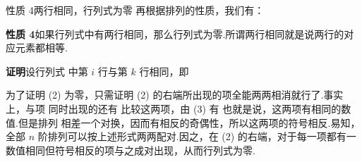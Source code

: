 \begin{fdeep}{性质 4\quad 两行相同，行列式为零}
再根据排列的性质，我们有：

\textbf{性质 4}\quad 如果行列式中有两行相同，那么行列式为零.所谓两行相同就是说两行的对应元素都相等.

\textbf{证明}\quad 设行列式
中第 $i$ 行与第 $k$ 行相同，即

为了证明 (2) 为零，只需证明 (2) 的右端所出现的项全能两两相消就行了.事实上，与项
同时出现的还有
比较这两项，由 (3) 有
也就是说，这两项有相同的数值.但是排列
相差一个对换，因而有相反的奇偶性，所以这两项的符号相反.易知，全部 $n$ 阶排列可以按上述形式两两配对.因之，在 (2) 的右端，对于每一项都有一数值相同但符号相反的项与之成对出现，从而行列式为零.
\end{fdeep}


